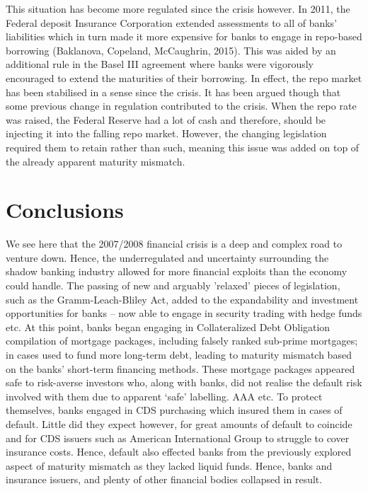 \documentclass[11pt, english]{article}
\begin{document}
	This situation has become more regulated since the crisis however. In 2011, the Federal deposit Insurance Corporation extended assessments to all of banks' liabilities which in turn made it more expensive for banks to engage in repo-based borrowing (Baklanova, Copeland, McCaughrin, 2015). This was aided by an additional rule in the Basel III agreement where banks were vigorously encouraged to extend the maturities of their borrowing. In effect, the repo market has been stabilised in a sense since the crisis. It has been argued though that some previous change in regulation contributed to the crisis. When the repo rate was raised, the Federal Reserve had a lot of cash and therefore, should be injecting it into the falling repo market. However, the changing legislation required them to retain rather than such, meaning this issue was added on top of the already apparent maturity mismatch.\\

\newpage

\section{Conclusions}

	We see here that the 2007/2008 financial crisis is a deep and complex road to venture down. Hence, the underregulated and uncertainty surrounding the shadow banking industry allowed for more financial exploits than the economy could handle. The passing of new and arguably 'relaxed' pieces of legislation, such as the Gramm-Leach-Bliley Act, added to the expandability and investment opportunities for banks – now able to engage in security trading with hedge funds etc. At this point, banks began engaging in Collateralized Debt Obligation compilation of mortgage packages, including falsely ranked sub-prime mortgages; in cases used to fund more long-term debt, leading to maturity mismatch based on the banks' short-term financing methods. These mortgage packages appeared safe to risk-averse investors who, along with banks, did not realise the default risk involved with them due to apparent `safe' labelling. AAA etc. To protect themselves, banks engaged in CDS purchasing which insured them in cases of default. Little did they expect however, for great amounts of default to coincide and for CDS issuers such as American International Group to struggle to cover insurance costs. Hence, default also effected banks from the previously explored aspect of maturity mismatch as they lacked liquid funds. Hence, banks and insurance issuers, and plenty of other financial bodies collapsed in result.\\
\end{document}
